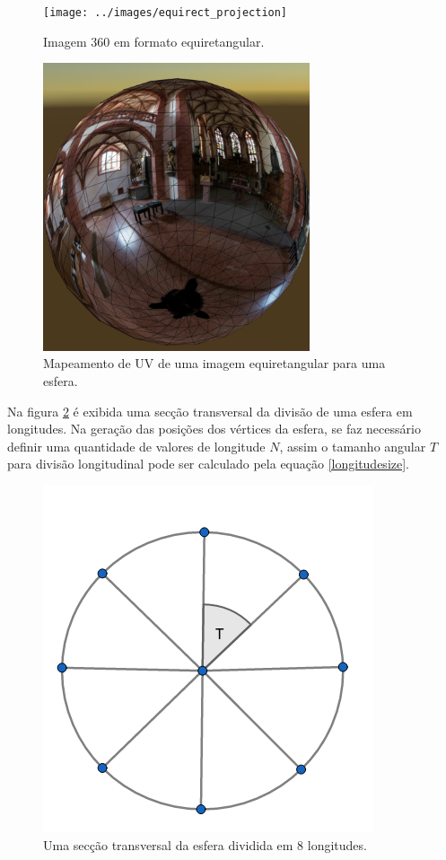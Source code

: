 \documentclass[conference]{IEEEtran}
\begin{document}
\begin{figure}[!tbp]
  \centering
  \begin{minipage}[b]{0.40\textwidth}
    \texttt{[image: ../images/equirect\_projection]}
    \caption{Imagem 360 em formato equiretangular.}
    \label{fig:equirectimage}
  \end{minipage}
  \hfill
  \begin{minipage}[b]{0.44\textwidth}
    \centering
    \includegraphics[width=0.7\textwidth]{../images/sphere.png}
    \caption{Mapeamento de UV de uma imagem equiretangular para uma esfera.}
    \label{fig:equisphere}
  \end{minipage}
\end{figure}

Na figura \ref{fig:sphere_transversalsec} é exibida uma secção transversal da divisão de uma esfera em longitudes. Na geração das posições dos vértices da esfera, se faz necessário definir uma quantidade de valores de longitude $N$, assim o tamanho angular $T$ para divisão longitudinal pode ser calculado pela equação \ref{longitudesize}.

\begin{figure}[ht]
\centering
\includegraphics[width=.25\textwidth]{../images/longitudes.png}
\caption{Uma secção transversal da esfera dividida em 8 longitudes.}
\label{fig:sphere_transversalsec}
\end{figure}
\end{document}
